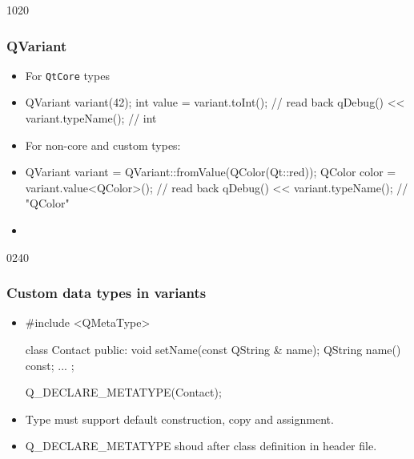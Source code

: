 \begin{slide}[fragile]{1020}\frametitle{QVariant}
\begin{itemize}
  \item For \texttt{QtCore} types  
  \item[] \begin{cpp}
QVariant variant(42);
int value = variant.toInt(); // read back
qDebug() << variant.typeName(); // int
\end{cpp}\vspace*{3mm}
\item For non-core and custom types:
  \item[] \begin{cpp}
QVariant variant = QVariant::fromValue(QColor(Qt::red));
QColor color = variant.value<QColor>(); // read back
qDebug() << variant.typeName(); // "QColor"
\end{cpp}\vspace*{3mm}
\item[] 
\end{itemize}
\end{slide}

\begin{slide}[fragile]{0240}
\frametitle{Custom data types in variants}
\begin{itemize}
\item[]
\begin{cpp}
#include <QMetaType>

class Contact
{
  public:
    void setName(const QString & name);
    QString name() const;
  ...
};

Q_DECLARE_METATYPE(Contact);
\end{cpp}\medskip
\item Type must support default construction, copy and assignment.\medskip
\item Q\_DECLARE\_METATYPE shoud after class definition in header file.
\end{itemize}
\end{slide}


